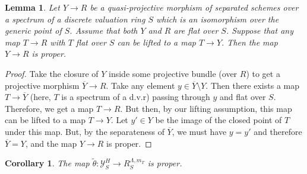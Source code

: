 \documentclass[11pt]{amsart}
\theoremstyle{plain}
\numberwithin{equation}{section}
\theoremstyle{definition}
\theoremstyle{plain}
\newtheorem{Lem}[Def]{Lemma}
\newtheorem{Cor}[Def]{Corollary}
\begin{document}
\begin{Lem} \label{rem:complete1}
    Let $Y\longrightarrow R$ be a quasi-projective morphism of separated schemes over a spectrum of a discrete valuation ring $S$ which is an isomorphism over the generic point of $S$. Assume that both $Y$ and $R$ are flat over $S$. Suppose that any map $T\longrightarrow R$ with $T$ flat over $S$ can be lifted to a map $T\longrightarrow Y$. Then the map $Y\longrightarrow R$ is proper.
\end{Lem}

\begin{proof}
 Take the closure of $Y$ inside some projective bundle (over $R$) to get a projective morphism $\overline{Y}\longrightarrow R$. Take any element $y\in \overline{Y}\setminus Y$. Then there exists a map $T\longrightarrow \overline{Y}$ (here, $T$ is a spectrum of a d.v.r) passing through $y$ and flat over $S$. Therefore, we get a map $T\longrightarrow R$. But then, by our lifting assumption,  this map can be lifted to a map $T\longrightarrow Y$. Let $y'\in Y$ be the image of the closed point of $T$ under this map. But, by the separateness of $\overline{Y}$, we must have $y=y'$ and therefore $\overline{Y}=Y$, and the map $Y\longrightarrow R$ is proper.  
\end{proof}


\begin{Cor}\cite[Proposition 5.11]{2a}\label{properness_short}
 The map $\tilde{\theta}: \mathcal Y^H_S\longrightarrow R^{\Lambda, m_T}_S$ is proper.
\end{Cor}
\end{document}
